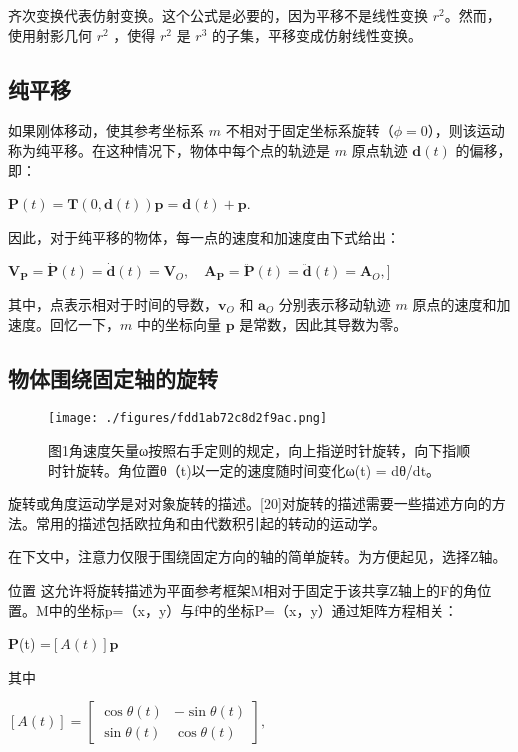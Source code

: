 齐次变换代表仿射变换。这个公式是必要的，因为平移不是线性变换 $ r^2 $。然而，使用射影几何 $r^2 $ ，使得 $ r^2 $ 是 $ r^3 $ 的子集，平移变成仿射线性变换。

\subsection{纯平移}

如果刚体移动，使其参考坐标系 $m$ 不相对于固定坐标系旋转（$\phi = 0$），则该运动称为纯平移。在这种情况下，物体中每个点的轨迹是 $m$ 原点轨迹 $\mathbf{d}(t)$ 的偏移，即：

$\mathbf{P}(t) = \mathbf{T}(0, \mathbf{d}(t))\mathbf{p} = \mathbf{d}(t) + \mathbf{p}$.

因此，对于纯平移的物体，每一点的速度和加速度由下式给出：

$\mathbf{V}_{\mathbf{P}} = \dot{\mathbf{P}}(t) = \dot{\mathbf{d}}(t) = \mathbf{V}_O, \quad \mathbf{A}_{\mathbf{P}} = \ddot{\mathbf{P}}(t) = \ddot{\mathbf{d}}(t) = \mathbf{A}_O,$]

其中，点表示相对于时间的导数，$\mathbf{v}_O$ 和 $\mathbf{a}_O$ 分别表示移动轨迹 $m$ 原点的速度和加速度。回忆一下，$m$ 中的坐标向量 $\mathbf{p}$ 是常数，因此其导数为零。

\subsection{ 物体围绕固定轴的旋转}

\begin{figure}[ht]
\centering
\texttt{[image: ./figures/fdd1ab72c8d2f9ac.png]}
\caption{图1角速度矢量ω按照右手定则的规定，向上指逆时针旋转，向下指顺时针旋转。角位置θ（t)以一定的速度随时间变化ω(t) = dθ/dt。} \label{fig_YDX_11}
\end{figure}

旋转或角度运动学是对对象旋转的描述。[20]对旋转的描述需要一些描述方向的方法。常用的描述包括欧拉角和由代数积引起的转动的运动学。

在下文中，注意力仅限于围绕固定方向的轴的简单旋转。为方便起见，选择Z轴。

位置 
这允许将旋转描述为平面参考框架M相对于固定于该共享Z轴上的F的角位置。M中的坐标p=（x，y）与f中的坐标P=（x，y）通过矩阵方程相关：

$\mathbf{P}$(t) =$[A(t)]\mathbf{p}$

其中

$[A(t)] = \begin{bmatrix}\cos \theta(t) & -\sin \theta(t) \\\sin \theta(t) & \cos \theta(t)\end{bmatrix},$

